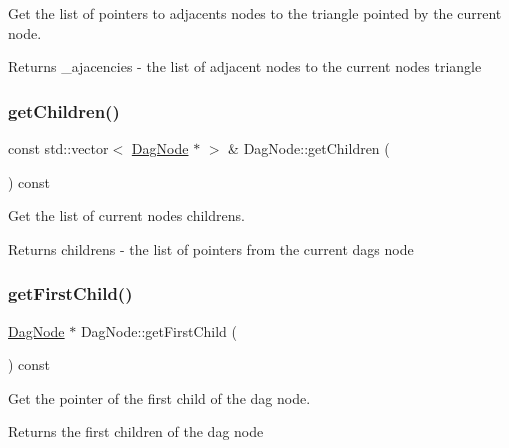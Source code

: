 Get the list of pointers to adjacents nodes to the triangle pointed by the current node. 

\begin{DoxyReturn}{Returns}
\+\_\+ajacencies -\/ the list of adjacent nodes to the current node\textquotesingle{}s triangle 
\end{DoxyReturn}
\mbox{\label{classDagNode_a3d0c86f01088ead2007a1c64c1dddf77}} 
\subsubsection{\texorpdfstring{get\+Children()}{getChildren()}}
{\footnotesize\ttfamily const std\+::vector$<$ \hyperlink{classDagNode}{Dag\+Node} $\ast$ $>$ \& Dag\+Node\+::get\+Children (\begin{DoxyParamCaption}{ }\end{DoxyParamCaption}) const\hspace{0.3cm}{\ttfamily [inline]}}



Get the list of current node\textquotesingle{}s childrens. 

\begin{DoxyReturn}{Returns}
childrens -\/ the list of pointers from the current dag\textquotesingle{}s node 
\end{DoxyReturn}
\mbox{\label{classDagNode_a35869cdb3ff3900d2ed4366270a39b83}} 
\subsubsection{\texorpdfstring{get\+First\+Child()}{getFirstChild()}}
{\footnotesize\ttfamily \hyperlink{classDagNode}{Dag\+Node} $\ast$ Dag\+Node\+::get\+First\+Child (\begin{DoxyParamCaption}{ }\end{DoxyParamCaption}) const\hspace{0.3cm}{\ttfamily [inline]}}



Get the pointer of the first child of the dag node. 

\begin{DoxyReturn}{Returns}
the first children of the dag node 
\end{DoxyReturn}
\mbox{\label{classDagNode_a301eaa7093739ce7892020a2a4c32cfd}} 
